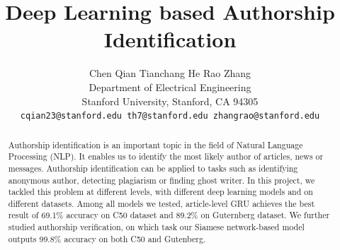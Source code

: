 \documentclass{article} %
\title{Deep Learning based Authorship Identification}
\author{
Chen Qian \qquad \qquad \qquad  Tianchang He \qquad  \qquad \qquad  Rao Zhang\\
Department of Electrical Engineering \\
Stanford University, Stanford, CA 94305 \\
\texttt{cqian23@stanford.edu \quad th7@stanford.edu \quad zhangrao@stanford.edu}\\
}
\begin{document}
\maketitle

\begin{abstract}
Authorship identification is an important topic in the field of Natural Language Processing (NLP). It enables us to identify the most likely author of articles, news or messages. Authorship identification can be applied to tasks such as identifying anonymous author, detecting plagiarism or finding ghost writer. In this project, we tackled this problem at different levels, with different deep learning models and on different datasets. Among all models we tested, article-level GRU achieves the best result of 69.1\% accuracy on C50 dataset and 89.2\% on Guternberg dataset. We further studied authorship verification, on which task our Siamese network-based model outputs 99.8\% accuracy on both C50 and Gutenberg.
\end{abstract}
\end{document}
